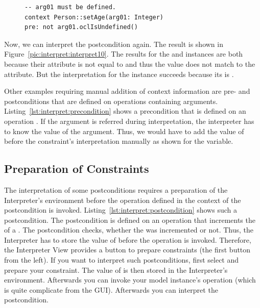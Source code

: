 \begin{figure}[!p]
  \vspace{3.0em}

  \lstset{
    language=OCL
  }
  \begin{lstlisting}[caption={An example Precondition defined on an Operation with Argument.}, captionpos=b, label=lst:interpret:precondition]
-- arg01 must be defined.
context Person::setAge(arg01: Integer)
pre: not arg01.oclIsUndefined()
  \end{lstlisting}
\end{figure}

Now, we can interpret the postcondition again. The result is shown in Figure~\ref{pic:interpret:interpret10}. The results for the  and  instances are both  because their  attribute is not equal to  and thus the  value does not match to the  attribute. But the interpretation for the  instance succeeds because its  is .

Other examples requiring manual addition of context information are pre- and postconditions that are defined on operations containing arguments. Listing~\ref{lst:interpret:precondition} shows a precondition that is defined on an operation . If the argument  is referred during interpretation, the interpreter has to know the value of the argument. Thus, we would have to add the value of  before the constraint's interpretation manually as shown for the  variable.



\subsection{Preparation of Constraints}

The interpretation of some postconditions requires a preparation of the Interpreter's environment before the operation defined in the context of the postcondition is invoked. Listing~\ref{lst:interpret:postcondition} shows such a postcondition. The postcondition is defined on an operation  that increments the  of a . The postcondition checks, whether the  was incremented or not. Thus, the Interpreter has to store the value of  before the operation  is invoked. Therefore, the Interpreter View provides a button to prepare constraints (the first button from the left). If you want to interpret such postconditions, first select and prepare your constraint. The value of  is then stored in the Interpreter's environment. Afterwards you can invoke your model instance's operation (which is quite complicate from the GUI). Afterwards you can interpret the postcondition.

